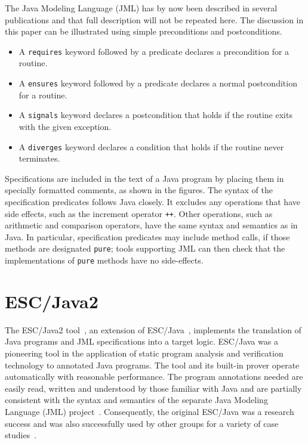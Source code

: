 \documentclass{sig-alternate2}
\begin{document}
The Java Modeling Language (JML) has by now been described in several publications
\cite{jmlpapers,Leavens-Baker-Ruby99b,Leavens-Baker-Ruby02} and that full description 
will not be repeated here. 
 The discussion in this paper
can be illustrated using simple preconditions and postconditions.  
\vspace*{-2ex}
\setlength{\partopsep}{0in}\setlength{\parskip}{0in}\setlength{\itemsep}{0in}\setlength{\topsep}{0in}
\begin{itemize}
\setlength{\partopsep}{0in}\setlength{\parskip}{0in}\setlength{\itemsep}{0in}\setlength{\topsep}{0in}\item A \texttt{requires} keyword followed by a predicate declares a precondition for a routine.
\item A \texttt{ensures} keyword followed by a predicate declares a normal postcondition for a routine.
\item A \texttt{signals} keyword declares a postcondition that holds if the routine exits with 
the given exception.
\item A \texttt{diverges} keyword declares a condition that holds if the routine never terminates.

\end{itemize}
Specifications are included in the text of a Java program by placing them in 
specially formatted comments, as shown in the figures.
The syntax of the specification predicates follows Java closely.  It excludes any operations 
that have side effects, such as the increment operator
 \texttt{++}.  Other operations, such as arithmetic and 
comparison operators, have the same syntax and semantics as in Java.  In particular, 
specification predicates may include method calls, if those methods are designated \texttt{pure};
tools supporting JML can then check that the implementations of \texttt{pure} methods have no side-effects.   

\section{ESC/Java2}

The ESC/Java2 tool~\cite{CokKiniry04}, an extension of ESC/Java~\cite{ESCJava,Flanagan-etal02},
 implements the translation of Java programs and JML specifications into
a target logic.   
ESC/Java
 was a pioneering tool in the
application of static program analysis and verification technology to
annotated Java programs.  The tool and its built-in
prover operate automatically with reasonable performance.  The 
program annotations needed are easily read, written and understood
by those familiar with Java and are partially consistent with the syntax
and semantics of the separate Java Modeling Language (JML)
project~\cite{jmlpapers,Leavens-etal00}.  Consequently, the original
ESC/Java was a research success
and was also successfully used by other groups for a variety of case
studies~\cite{HOP04}.
\end{document}
